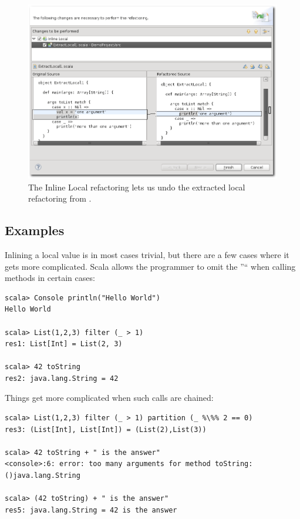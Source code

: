 \documentclass[10pt,a4paper,oneside]{scrreprt}
\begin{document}
\begin{figure}
  \centering
  \includegraphics[width=\linewidth]{inline_local_screenshot_1.png}
  \caption{The Inline Local refactoring lets us undo the extracted local refactoring from .}
  \label{figure:inline-local-screenshot-1}
\end{figure}

\subsection{Examples}

Inlining a local value is in most cases trivial, but there are a few cases where it gets more complicated. Scala allows the programmer to omit the ''`` when calling methods in certain cases:

\begin{lstlisting}
scala> Console println("Hello World")
Hello World

scala> List(1,2,3) filter (_ > 1)
res1: List[Int] = List(2, 3)

scala> 42 toString
res2: java.lang.String = 42
\end{lstlisting}

Things get more complicated when such calls are chained:

\begin{lstlisting}
scala> List(1,2,3) filter (_ > 1) partition (_ %\%% 2 == 0)
res3: (List[Int], List[Int]) = (List(2),List(3))

scala> 42 toString + " is the answer"
<console>:6: error: too many arguments for method toString: ()java.lang.String

scala> (42 toString) + " is the answer"
res5: java.lang.String = 42 is the answer
\end{lstlisting}
\end{document}
